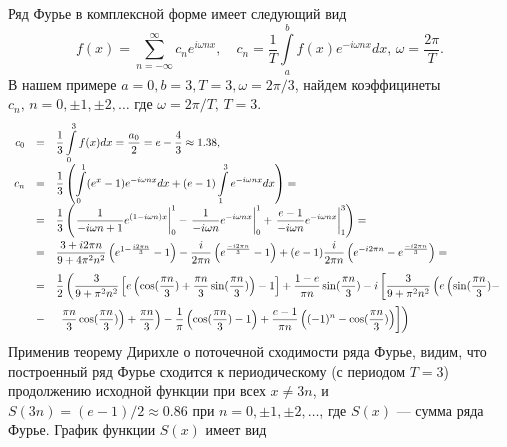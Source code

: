 \noindent
Ряд Фурье в комплексной форме имеет следующий вид
\[
f(x) = \sum_{n=-\infty}^\infty c_n e^{i\omega nx},\quad c_n=\frac{1}{T}\int\limits_a^b f(x) e^{-i\omega nx}dx,\,\omega=\frac{2\pi}{T}.
\]
В нашем примере $ a=0,b=3,T=3,\omega=2\pi/3$, 
найдем коэффицинеты $c_n,\,n=0,\pm1,\pm2,\ldots$
где $\omega=2\pi/T,\,T=3.$
$$
\begin{array}{rcl}
c_0 &=&\displaystyle\frac{1}{3} \int\limits_0^3 f(x)dx=\frac{a_0}{2}=e-\frac{4}{3} \approx 1.38,\\[12pt]
c_n &=&\displaystyle\frac{1}{3}\left(
\int\limits_0^1
(e^x-1)e^{-i\omega nx}dx+ (e-1)\int\limits_1^3
e^{-i\omega nx}dx \right) ={}\\[12pt]
&=&\displaystyle\frac{1}{3}\left(
\left.\frac{1}{-i\omega n + 1} e^{(1-i\omega n)x} \right|_0^1
-\left.\frac{1}{-i\omega n} e^{-i\omega nx} \right|_0^1
+\left.\frac{e-1}{-i\omega n}e^{-i\omega nx}\right|_1^3\right) = \\[12pt]
&=&\displaystyle\frac{3+i2\pi n}{9+4\pi^2 n^2}\left(e^{1-\frac{i2\pi n}{3}}-1 \right)-\frac{i}{2\pi n}\left(e^{\frac{-i2\pi n}{3}}-1 \right)+(e-1)\frac{i}{2 \pi n}\left(e^{-i2\pi n}-e^{\frac{-i2\pi n}{3}} \right)= \\[12pt]
&=&
\displaystyle\frac{1}{2}\left(\frac{3}{9+\pi^2n^2}\left[e\left(\cos(\frac{\pi n}{3}) +\frac{\pi n}{3}\sin(\frac{\pi n}{3})\right)-1\right]+ \frac{1-e}{\pi n}\sin(\frac{\pi n}{3})-i\left[\frac{3}{9+\pi^2n^2}\left(e\left(\sin(\frac{\pi n}{3})-\right.\right.\right.\right.\medskip \\ 
&-&\left.\left.\left.\left.\displaystyle\frac{\pi n}{3}\cos(\frac{\pi n}{3})\right)+\displaystyle\frac{\pi n}{3}\right)-\displaystyle\frac{1}{\pi}\left(\cos(\displaystyle\frac{\pi n}{3})- 1\right)+\displaystyle\frac{e-1}{\pi n}\left((-1)^n-\cos(\displaystyle\frac{\pi n}{3})\right)\right]\right)
\end{array}
$$
\noindent
Применив теорему Дирихле о поточечной сходимости ряда Фурье, видим, что построенный ряд Фурье сходится 
к периодическому (с периодом $T=3$) продолжению исходной функции при всех $x\ne 3n$, и $S(3n)=(e-1)/2 \approx 0.86$ при 
$n=0,\pm1,\pm2,\ldots$, где $S(x)$ --- сумма ряда Фурье. График функции $S(x)$ имеет вид
